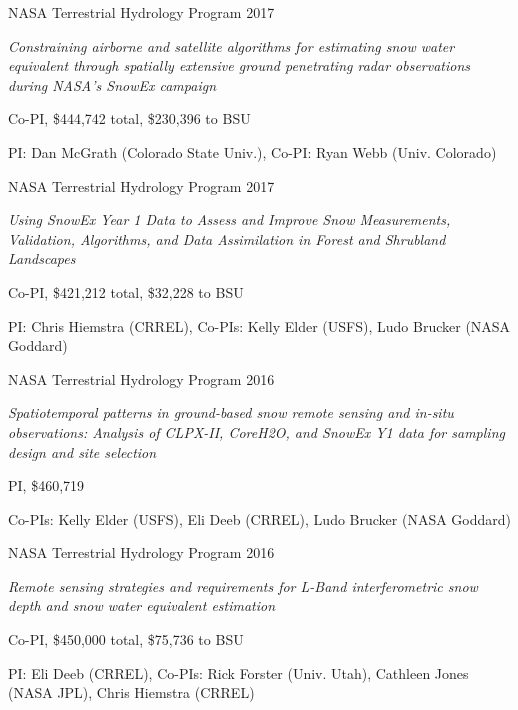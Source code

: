 \documentclass[11pt]{article}
\renewenvironment{itemize}{
  \begin{list}{}{
    \setlength{\leftmargin}{1.5em}
    \setlength{\itemsep}{0pt}
    \setlength{\parskip}{0pt}
  }
}{
  \end{list}
}
\begin{document}
\begin{itemize}
\pagebreak

\item [6/2018-6/2021] NASA Terrestrial Hydrology Program 2017
\begin{itemize}
\item \textit{Constraining airborne and satellite algorithms for estimating snow water equivalent through spatially extensive ground penetrating radar observations during NASA's SnowEx campaign}
\item Co-PI, \$444,742 total, \$230,396 to BSU
\item PI: Dan McGrath (Colorado State Univ.), Co-PI: Ryan Webb (Univ. Colorado)
\end{itemize}

\item [6/2018-6/2021] NASA Terrestrial Hydrology Program 2017
\begin{itemize}
\item \textit{Using SnowEx Year 1 Data to Assess and Improve Snow Measurements, Validation, Algorithms, and Data Assimilation in Forest and Shrubland Landscapes}
\item Co-PI, \$421,212 total, \$32,228 to BSU
\item PI: Chris Hiemstra (CRREL), Co-PIs: Kelly Elder (USFS), Ludo Brucker (NASA Goddard)
\end{itemize}

\item [6/2017-6/2022] NASA Terrestrial Hydrology Program 2016
\begin{itemize}
\item \textit{Spatiotemporal patterns in ground-based snow remote sensing and in-situ observations: Analysis of CLPX-II, CoreH2O, and SnowEx Y1 data for sampling design and site selection}
\item PI, \$460,719
\item Co-PIs: Kelly Elder (USFS), Eli Deeb (CRREL), Ludo Brucker (NASA Goddard)
\end{itemize}

\item [6/2017-6/2022] NASA Terrestrial Hydrology Program 2016
\begin{itemize}
\item \textit{Remote sensing strategies and requirements for L-Band interferometric snow depth and snow water equivalent estimation}
\item Co-PI, \$450,000 total, \$75,736 to BSU
\item PI: Eli Deeb (CRREL), Co-PIs: Rick Forster (Univ. Utah), Cathleen Jones (NASA JPL), Chris Hiemstra (CRREL)
\end{itemize}


\end{itemize}
\end{document}
